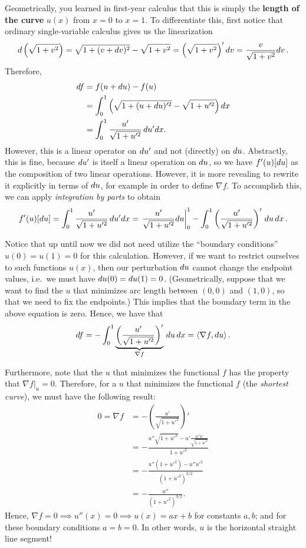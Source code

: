 Geometrically, you learned in first-year calculus that this is simply the \textbf{length of the curve} $u(x)$ from  $x=0$ to $x=1$. To differentiate this, first notice that ordinary single-variable calculus gives us the linearization
\[
d \left( \sqrt{1 + v^2} \right) = \sqrt{1+ (v + d v)^2} - \sqrt{1 + v^2} = \left( \sqrt{1 + v^2} \right)' d v =  \frac{v}{\sqrt{1+ v^2}} d v \, .
\]
Therefore, 
\begin{align*}
   d f &= f(u+ d u) - f(u) \\
   &= \int_0^1 \left( \sqrt{1 + (u+d u)'^2} - \sqrt{1 + u'^2} \right) d x \\
   &= \int_0^1 \frac{u'}{\sqrt{1 + u'^2}} \, d u'  d x.
\end{align*}
However, this is a linear operator on $d u'$ and not (directly) on $d u$.  Abstractly, this is fine, because $d u'$ is itself a linear operation on $d u$, so we have $f'(u)[d u]$ as the composition of two linear operations.  However, it is more revealing to rewrite it explicitly in terms of $d u$, for example in order to define $\nabla f$. To accomplish this, we can apply \emph{integration by parts} to obtain 
\[
f'(u) [d u] = \int_0^1 \frac{u'}{\sqrt{1 + u'^2}} \, d u' d x = \left. \frac{u'}{\sqrt{1 + u'^2}} d u \right|_0^1 - \int_0^1 \left(\frac{u'}{\sqrt{1 + u'^2}}\right)' \, d u \, d x \, .
\]



Notice that up until now we did not need utilize the ``boundary conditions'' $u(0) = u(1) = 0$ for this calculation. However, if we want to restrict ourselves to such functions $u(x)$, then our perturbation $d u$ cannot change the endpoint values, i.e.~we must have $d u(0) = d u(1) = 0$.
(Geometrically, suppose that we want to find the  $u$ that minimizes arc length between $(0,0)$ and $(1,0)$, so that we need to fix the endpoints.) This implies that the boundary term in the above equation is zero. 
Hence, we have that 
\[
d f = -\int_0^1 \underbrace{\left(\frac{u'}{\sqrt{1 + u'^2}}\right)'}_{\nabla f} \, d u \, d x = \langle \nabla f , d u \rangle \, .
\]

Furthermore, note that the $u$ that minimizes the functional $f$ has the property that $\left. \nabla f \right|_u = 0$. Therefore, for a $u$ that minimizes the functional $f$ (the \emph{shortest curve}), we must have the following result: 
\begin{align*}
    0 = \nabla f &= -\left(\frac{u'}{\sqrt{1 + u'^2}}\right)' \\
    &= -\frac{u'' \sqrt{1 + u'^2} - u' \frac{u'' u '}{\sqrt{1 + u'^2}}}{ 1 + u'^2} \\
    &= -\frac{u'' ( 1 + u'^2) - u'' u'^2}{(1 + u'^2)^{3/2}} \\
    &= -\frac{u''}{( 1+ u'^2)^{3/2}}.
\end{align*}
Hence, $\nabla f = 0 \implies u''(x) = 0 \implies u(x) = ax + b$ for constants $a,b$; and for these boundary conditions $a=b=0$. In other words, $u$ is the horizontal straight line segment!

